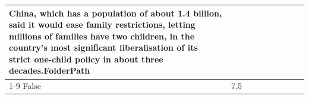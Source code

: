 \begin{table}[H]
\begin{tabular}{lllrlllll}
China, which has a population of about 1.4 billion, said it would ease family restrictions, letting millions of families have two children, in the country's most significant liberalisation of its strict one-child policy in about three decades.FolderPath \\
\cline{1-9}
False & 7.5%
\end{tabular}
\end{table}
